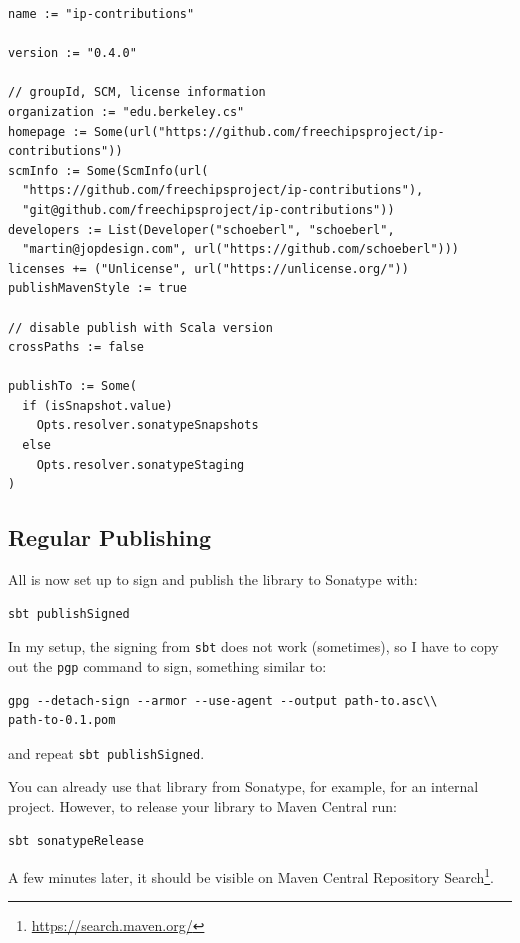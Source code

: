 \documentclass[%
    10pt,
    headinclude, footinclude=false,
    openright, %
    notitlepage,
    cleardoublepage=empty,
    headsepline,
    numbers=noenddot,
    bibliography=totoc, index=totoc,
    ]{scrbook}
\newcommand{\code}[1]{{\lstinline[basicstyle=\small\ttfamily]{#1}}}
\newcommand{\myref}[2]{\href{#1}{#2}}
\renewcommand{\myref}[2]{{#2}{\footnote{\url{#1}}}}
\begin{document}
{\small
\begin{verbatim}
name := "ip-contributions"

version := "0.4.0"

// groupId, SCM, license information
organization := "edu.berkeley.cs"
homepage := Some(url("https://github.com/freechipsproject/ip-contributions"))
scmInfo := Some(ScmInfo(url(
  "https://github.com/freechipsproject/ip-contributions"),
  "git@github.com/freechipsproject/ip-contributions"))
developers := List(Developer("schoeberl", "schoeberl",
  "martin@jopdesign.com", url("https://github.com/schoeberl")))
licenses += ("Unlicense", url("https://unlicense.org/"))
publishMavenStyle := true

// disable publish with Scala version
crossPaths := false

publishTo := Some(
  if (isSnapshot.value)
    Opts.resolver.sonatypeSnapshots
  else
    Opts.resolver.sonatypeStaging
)
\end{verbatim}
}

\subsection{Regular Publishing}

All is now set up to sign and publish the library to Sonatype with:

\begin{verbatim}
sbt publishSigned
\end{verbatim}

In my setup, the signing from \code{sbt} does not work (sometimes), so I have to copy
out the \code{pgp} command to sign, something similar to:

\begin{verbatim}
gpg --detach-sign --armor --use-agent --output path-to.asc\\
path-to-0.1.pom
\end{verbatim}

\noindent and repeat \code{sbt publishSigned}.

You can already use that library from Sonatype, for example, for an internal project.
However, to release your library to Maven Central run:

\begin{verbatim}
sbt sonatypeRelease
\end{verbatim}

A few minutes later, it should be visible on \myref{https://search.maven.org/}{Maven Central
Repository Search}.
\end{document}
